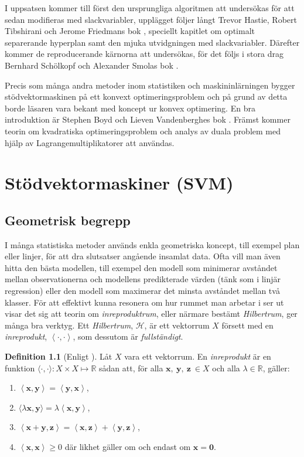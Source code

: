 \documentclass[a4paper, 12pt]{report}
\theoremstyle{definition}
\newtheorem{defi}{Definition}[section]
\theoremstyle{remark}
\newcommand{\llangle}{\left\langle}
\newcommand{\rrangle}{\right\rangle}
\newcommand{\inprod}[2]{\llangle \mathbf{#1}, \mathbf{#2}\rrangle}
\begin{document}
I uppsatsen kommer till först den ursprungliga algoritmen att undersökas för att sedan modifieras med slackvariabler, upplägget följer långt Trevor Hastie, Robert Tibshirani och Jerome Friedmans bok \cite{ESL}, speciellt kapitlet om optimalt separerande hyperplan samt den mjuka utvidgningen med slackvariabler.
Därefter kommer de reproducerande kärnorna att undersökas, för det följs i stora drag Bernhard Schölkopf och Alexander Smolas bok \cite{LearningKernels}.

Precis som många andra metoder inom statistiken och maskininlärningen bygger stödvektormaskinen på ett konvext optimeringsproblem och på grund av detta borde läsaren vara bekant med koncept ur konvex optimering.
En bra introduktion är Stephen Boyd och Lieven Vandenberghes bok \cite{Boyd}.
Främst kommer teorin om kvadratiska optimeringsproblem och analys av duala problem med hjälp av Lagrangemultiplikatorer att användas.

\chapter{Stödvektormaskiner (SVM)}

\section{Geometrisk begrepp}
I många statistiska metoder används enkla geometriska koncept, till exempel plan eller linjer, för att dra slutsatser angående insamlat data.
Ofta vill man även hitta den bästa modellen, till exempel den modell som minimerar avståndet mellan observationerna och modellens predikterade värden (tänk som i linjär regression) eller den modell som maximerar det minsta avståndet mellan två klasser.
För att effektivt kunna resonera om hur rummet man arbetar i ser ut visar det sig att teorin om \emph{inreproduktrum}, eller närmare bestämt \emph{Hilbertrum}, ger många bra verktyg.
Ett \emph{Hilbertrum}, $\mathcal{H}$, är ett vektorrum $X$ försett med en \emph{inreprodukt}, $\llangle \cdot, \cdot\rrangle$, som dessutom är \emph{fullständigt}.

\begin{defi}[Enligt \cite{Young}]\label{def:inreprodukt}
	Låt $X$ vara ett vektorrum. En \emph{inreprodukt} är en funktion $\langle \cdot , \cdot \rangle: X\times X \longmapsto \mathbb{R}$ sådan att, för alla $\mathbf{x},~\mathbf{y},~\mathbf{z}~\in X$ och alla $\lambda \in \mathbb{R}$, gäller:
	\begin{enumerate}[label=\textbf{IP\arabic*}]
		\item \label{IP1} $\inprod{x}{y} = \inprod{y}{x}$,
		\item \label{IP2} $\langle \lambda \mathbf{x}, \mathbf{y}\rangle = \lambda \inprod{x}{y}$,
		\item \label{IP3} $\inprod{x+y}{z} =\inprod{x}{z} + \inprod{y}{z}$,
		\item \label{IP4} $\inprod{x}{x} \geq 0$ där likhet gäller om och endast om $\mathbf{x} = \mathbf{0}$. 
	\end{enumerate}
\end{defi}
\end{document}
